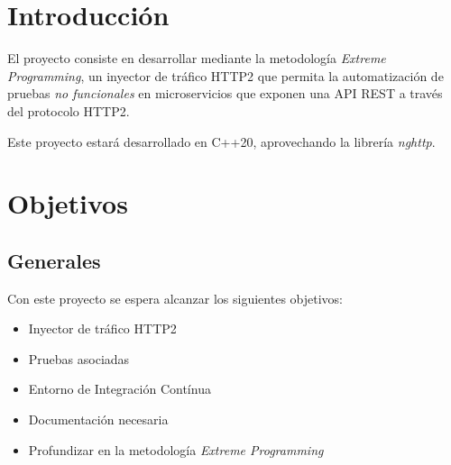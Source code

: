 \newpage
\section{Introducción}
El proyecto consiste en desarrollar mediante la metodología \emph{Extreme Programming}\cite{xp}, un inyector de tráfico HTTP2\cite{http2} que permita la automatización de pruebas \emph{no funcionales} en microservicios que exponen una API REST a través del protocolo HTTP2.

Este proyecto estará desarrollado en C++20\cite{cpp}, aprovechando la librería \emph{nghttp}\cite{nghttp}.


\section{Objetivos}
\subsection{Generales}
Con este proyecto se espera alcanzar los siguientes objetivos:

\begin{itemize}
    \item Inyector de tráfico HTTP2
    \item Pruebas asociadas
    \item Entorno de Integración Contínua
    \item Documentación necesaria
    \item Profundizar en la metodología \emph{Extreme Programming}
\end{itemize}


